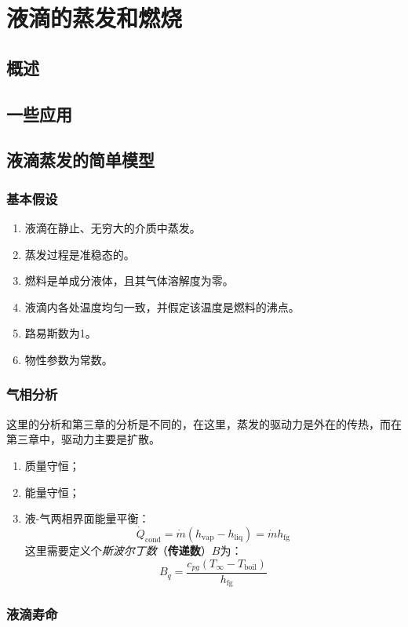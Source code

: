 \section{液滴的蒸发和燃烧}
\subsection{概述}
\subsection{一些应用}
\subsection{液滴蒸发的简单模型}
\subsubsection{基本假设}
\begin{enumerate}
    \item 液滴在静止、无穷大的介质中蒸发。
    \item 蒸发过程是准稳态的。
    \item 燃料是单成分液体，且其气体溶解度为零。
    \item 液滴内各处温度均匀一致，并假定该温度是燃料的沸点。
    \item 路易斯数为1。
    \item 物性参数为常数。
\end{enumerate}

\subsubsection{气相分析}
这里的分析和第三章的分析是不同的，在这里，蒸发的驱动力是外在的传热，而在第三章中，驱动力主要是扩散。
\begin{enumerate}
    \item 质量守恒；
    \item 能量守恒；
    \item 液-气两相界面能量平衡：
    \[
        \dot{Q}_\text{cond}=\dot{m}(h_\text{vap}-h_\text{liq})=\dot{m}h_\text{fg}
    \]
    这里需要定义个\textit{斯波尔丁数}（\textbf{传递数}）\(B\)为：
    \[
        B_q = \frac{c_{pg}(T_\infty-T_\text{boil})}{h_\text{fg}}
    \]
\end{enumerate}

\subsubsection{液滴寿命}

